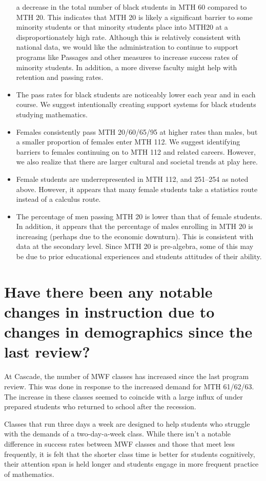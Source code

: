 \begin{itemize}
      a decrease in the total number of black students in MTH 60 compared to
      MTH 20. This indicates that MTH 20 is likely a significant barrier to
      some minority students or that minority students place into MTH20 at a
      disproportionately high rate. Although this is relatively consistent with
      national data, we would like the administration to continue to support
      programs like Passages and other measures to increase success rates of
      minority students. In addition, a more diverse faculty might help with
      retention and passing rates.
    \item The pass rates for black students are noticeably lower each year and
      in each course. We suggest intentionally creating support systems for
      black students studying mathematics.
    \item Females consistently pass MTH 20/60/65/95 at higher rates than males,
      but a smaller proportion of females enter MTH 112. We suggest identifying
      barriers to females continuing on to MTH 112 and related careers.
      However, we also realize that there are larger cultural and societal
      trends at play here.
    \item Female students are underrepresented in MTH 112, and 251--254 as
      noted above. However, it appears that many female students take a
      statistics route instead of a calculus route.
    \item The percentage of men passing MTH 20 is lower than that of female
      students. In addition, it appears that the percentage of males enrolling
      in MTH 20 is increasing (perhaps due to the economic downturn). This is
      consistent with data at the secondary level. Since MTH 20 is pre-algebra,
      some of this may be due to prior educational experiences and students
      attitudes of their ability.
\end{itemize}

\section{Have there been any notable changes in instruction due to changes in
demographics since the last review?}
At Cascade, the number of MWF classes has increased since the last program
review. This was done in response to the increased demand for MTH 61/62/63. The
increase in these classes seemed to coincide with a large influx of
under prepared students who returned to school after the recession.

Classes that run three days a week are designed to help students who struggle
with the demands of a two-day-a-week class.  While there isn't a notable
difference in success rates between MWF classes and those that meet less
frequently, it is felt that the shorter class time is better for students
cognitively, their attention span is held longer and students engage in more
frequent practice of mathematics.  

